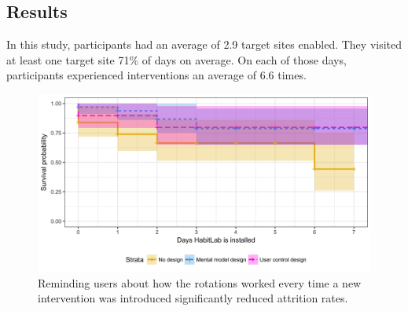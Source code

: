\subsection{Results}

In this study, participants had an average of 2.9 target sites enabled. They visited at least one target site 71\% of days on average. On each of those days, participants experienced interventions an average of 6.6 times.


\begin{figure}
\centering
	\includegraphics[width=1.0\textwidth]{figures/none_vs_info.png}
	\caption{Reminding users about how the rotations worked every time a new intervention was introduced significantly reduced attrition rates.}
\label{fig:attrition_none_vs_info}
\end{figure}

